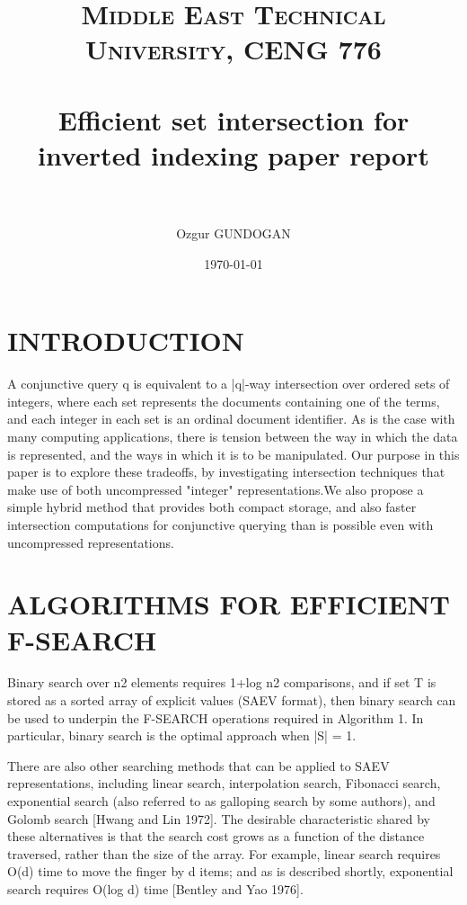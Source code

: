 \documentclass[paper=a4, fontsize=11pt]{scrartcl} %
\title{	
\normalfont \normalsize 
\textsc{Middle East Technical University, CENG 776} \\ [25pt] %
\horrule{0.5pt} \\[0.4cm] %
\huge Efficient set intersection for inverted indexing paper report \\ %
\horrule{2pt} \\[0.5cm] %
}
\author{Ozgur GUNDOGAN} %
\date{\normalsize\today} %
\numberwithin{equation}{section} %
\numberwithin{figure}{section} %
\numberwithin{table}{section} %
\begin{document}
\maketitle %


\section{INTRODUCTION}

 A conjunctive query q is equivalent to a
|q|-way intersection over ordered sets of integers, where each set represents the documents containing
one of the terms, and each integer in each set is an ordinal document identifier. As is the
case with many computing applications, there is tension between the way in which the data is represented,
and the ways in which it is to be manipulated. 
Our purpose in this paper is to explore these
tradeoffs, by investigating intersection techniques that make use of both uncompressed "integer" representations.We also propose a simple hybrid method that provides both compact storage, and also faster intersection computations for conjunctive
querying than is possible even with uncompressed representations.

\section{ALGORITHMS FOR EFFICIENT F-SEARCH}
Binary search over n2 elements requires 1+log n2 comparisons, and if set T is stored as a sorted array of explicit values (SAEV format), then binary search can be used to underpin the F-SEARCH operations required in Algorithm 1. In particular, binary search is the optimal approach when |S| = 1.  
\linebreak

There are also other searching methods that can be applied to SAEV representations,
including linear search, interpolation search, Fibonacci search, exponential search (also referred to as galloping search by some authors), and Golomb search [Hwang and Lin 1972]. The desirable characteristic shared by these alternatives is that the search cost grows as a function of the distance traversed, rather than the size of the array. For example, linear search requires O(d) time to move the finger by d items; and as is described shortly, exponential search requires O(log d) time [Bentley and Yao 1976].
\linebreak
\end{document}
